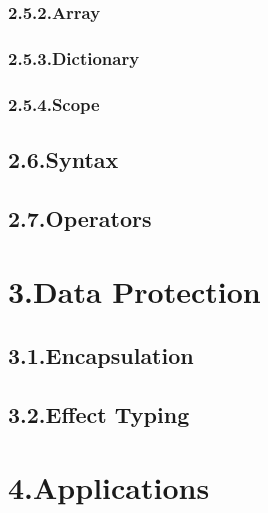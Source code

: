 \documentclass[preprint]{{sigplanconf}}
\begin{document}
\subsubsection{2.5.2.\hspace*{0.5em}Array}\label{sec-array}%

\subsubsection{2.5.3.\hspace*{0.5em}Dictionary}\label{sec-dictionary}%

\subsubsection{2.5.4.\hspace*{0.5em}Scope}\label{sec-scope}%

\subsection{2.6.\hspace*{0.5em}Syntax}\label{sec-syntax}%

\subsection{2.7.\hspace*{0.5em}Operators}\label{sec-operators}%

\section{3.\hspace*{0.5em}Data Protection}\label{sec-data-protection}%

\subsection{3.1.\hspace*{0.5em}Encapsulation}\label{sec-encapsulation}%

\subsection{3.2.\hspace*{0.5em}Effect Typing}\label{sec-effect-typing}%

\section{4.\hspace*{0.5em}Applications}\label{sec-applications}%
\end{document}
